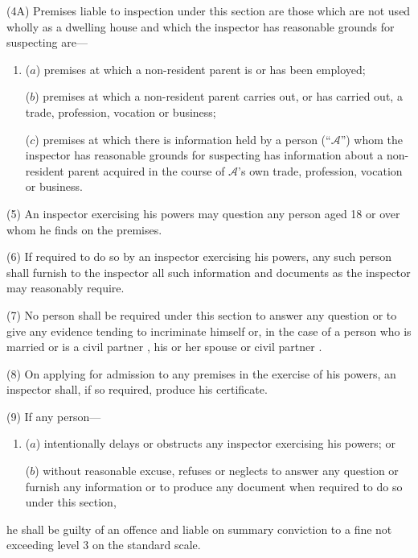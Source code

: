\documentclass[12pt,a4paper]{article}
\begin{document}
(4A) Premises liable to inspection under this section are those which are not used wholly as a dwelling house and which the inspector has reasonable grounds for suspecting are—
\begin{enumerate}\item[]
($a$) premises at which a non-resident parent is or has been employed;

($b$) premises at which a non-resident parent carries out, or has carried out, a trade, profession, vocation or business;

($c$) premises at which there is information held by a person (“$\mathcal{A}$”) whom the inspector has reasonable grounds for suspecting has information about a non-resident parent acquired in the course of $\mathcal{A}$’s own trade, profession, vocation or business.
\end{enumerate}

(5) An inspector exercising his powers may question any person aged 18 or over whom he finds on the premises.

(6) If required to do so by an inspector exercising his powers, 
%
%
%
any such person  %
shall furnish to the inspector all such information and documents as the inspector may 
reasonably require.

(7) No person shall be required under this section to answer any question or to give any evidence tending to incriminate himself or, in the case of a person who is married
or is a civil partner%
, his or her spouse
or civil partner%
.

(8) On applying for admission to any premises in the exercise of his powers, an inspector shall, if so required, produce his certificate.

(9) If any person—
\begin{enumerate}\item[]
($a$) intentionally delays or obstructs any inspector exercising his powers; or

($b$) without reasonable excuse, refuses or neglects to answer any question or furnish any information or to produce any document when required to do so under this section,
\end{enumerate}
he shall be guilty of an offence and liable on summary conviction to a fine not exceeding level 3 on the standard scale.
\end{document}
